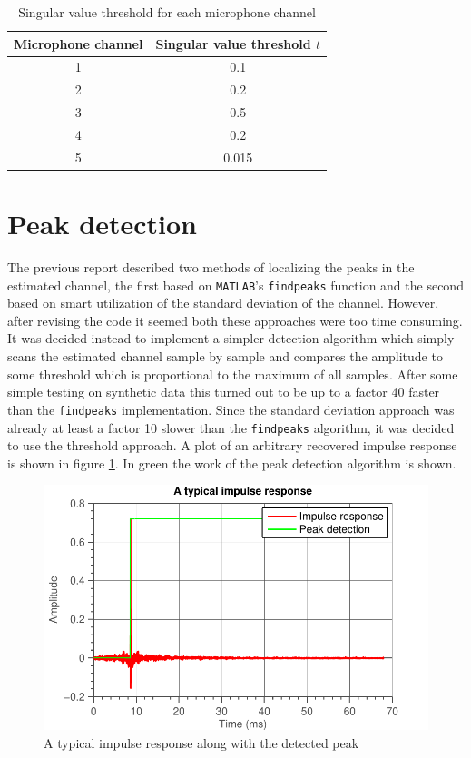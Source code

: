 \documentclass[11pt,titlepage]{report}
\begin{document}

\begin{table}[H]
\centering
\begin{tabular}{ c | c}
\hline \hline
Microphone channel & Singular value threshold $t$ \\
\hline
1 & \num{0.1} \\ 
2 & \num{0.2} \\
3 & \num{0.5} \\
4 & \num{0.2} \\
5 & \num{0.015} \\
\end{tabular}
\caption{Singular value threshold for each microphone channel}
\label{tab:loc_svd_value}
\end{table}

\section{Peak detection}
\label{sec:loc_peak}
The previous report \cite{epo4-del7} described two methods of localizing the peaks in the estimated channel, the first based on \texttt{MATLAB}'s \texttt{findpeaks} function and the second based on smart utilization of the standard deviation of the channel. However, after revising the code it seemed both these approaches were too time consuming. It was decided instead to implement a simpler detection algorithm which simply scans the estimated channel sample by sample and compares the amplitude to some threshold which is proportional to the maximum of all samples. After some simple testing on synthetic data this turned out to be up to a factor \num{40} faster than the \texttt{findpeaks} implementation. Since the standard deviation approach was already at least a factor \num{10} slower than the \texttt{findpeaks} algorithm, it was decided to use the threshold approach. 
A plot of an arbitrary recovered impulse response is shown in figure \ref{fig:localization-typical-impulse}. In green the work of the peak detection algorithm is shown. 

\begin{figure}[H]
	\centering
	\includegraphics[width=0.5\linewidth]{resource/typical-impulse.pdf}
	\caption{A typical impulse response along with the detected peak}
	\label{fig:localization-typical-impulse}
\end{figure}
\end{document}
